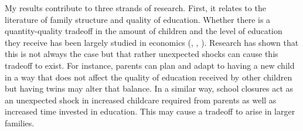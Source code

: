 


My results contribute to three strands of research. First, it relates to the literature of family structure and quality of education. Whether there is a quantity-quality tradeoff in the amount of children and the level of education they receive has been largely studied in economics (\cite{becker_child_1976}, \cite{black_more_2005}, \cite{black_small_2010}). Research has shown that this is not always the case but that rather unexpected shocks can cause this tradeoff to exist. For instance, parents can plan and adapt to having a new child in a way that does not affect the quality of education received by other children but having twins may alter that balance. In a similar way, school closures act as an unexpected shock in increased childcare required from parents as well as increased time invested in education. This may cause a tradeoff to arise in larger families.

